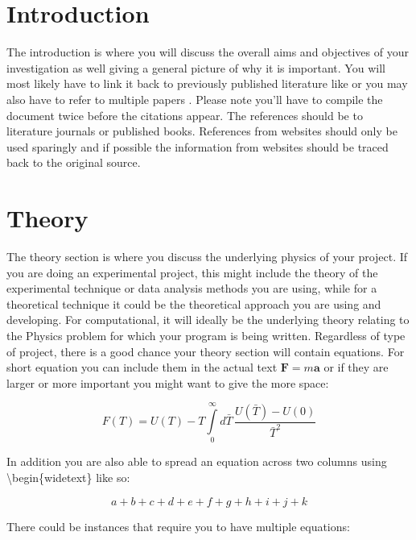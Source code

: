 \documentclass[a4paper, twocolumn, 12pt, notitlepage]{revtex4-1}
\begin{document}
\section{Introduction}
The introduction is where you will discuss the overall aims and objectives of your investigation as well giving a general picture of why it is important. You will most likely have to link it back to previously published literature like  \cite{Paper_1} or you may also have to refer to multiple papers \cite{Paper_1, Paper_2, Paper_3}. Please note you'll have to compile the document twice before the citations appear. The references should be to literature journals or published books. References from websites should only be used sparingly and if possible the information from websites should be traced back to the original source. 




\section{Theory}
The theory section is where you discuss the underlying physics of your project. If you are doing an experimental project, this might include the theory of the experimental technique or data analysis methods you are using, while for a theoretical technique it could be the theoretical approach you are using and developing. For computational, it will ideally be the underlying theory relating to the Physics problem for which your program is being written. Regardless of type of project, there is a good chance your theory section will contain equations. For short equation you can include them in the actual text $\mathbf{F} = m\mathbf{a}$ or if they are larger or more important you might want to give the more space:

\begin{equation}
F(T) = U(T) - T \int\limits_0^\infty d \bar{T} \, \frac{U(\bar{T}) - U(0)}{\bar{T}^2}
\end{equation}

In addition you are also able to spread an equation across two columns using \textbackslash begin\{widetext\} like so:

\begin{widetext}
\[
a + b + c + d+e+f+g+h+i+j+k
\]
\end{widetext}

There could be instances that require you to have multiple equations:
\end{document}
